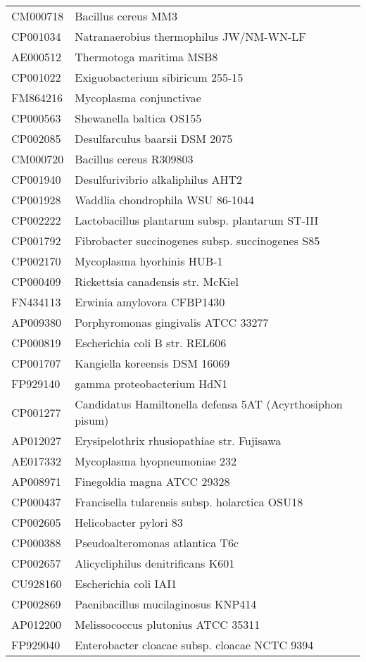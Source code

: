 \begin{longtable}{ll}
CM000718 & Bacillus cereus MM3\\
CP001034 & Natranaerobius thermophilus JW/NM-WN-LF\\
AE000512 & Thermotoga maritima MSB8\\
CP001022 & Exiguobacterium sibiricum 255-15\\
FM864216 & Mycoplasma conjunctivae\\
CP000563 & Shewanella baltica OS155\\
CP002085 & Desulfarculus baarsii DSM 2075\\
CM000720 & Bacillus cereus R309803\\
CP001940 & Desulfurivibrio alkaliphilus AHT2\\
CP001928 & Waddlia chondrophila WSU 86-1044\\
CP002222 & Lactobacillus plantarum subsp. plantarum ST-III\\
CP001792 & Fibrobacter succinogenes subsp. succinogenes S85\\
CP002170 & Mycoplasma hyorhinis HUB-1\\
CP000409 & Rickettsia canadensis str. McKiel\\
FN434113 & Erwinia amylovora CFBP1430\\
AP009380 & Porphyromonas gingivalis ATCC 33277\\
CP000819 & Escherichia coli B str. REL606\\
CP001707 & Kangiella koreensis DSM 16069\\
FP929140 & gamma proteobacterium HdN1\\
CP001277 & Candidatus Hamiltonella defensa 5AT (Acyrthosiphon pisum)\\
AP012027 & Erysipelothrix rhusiopathiae str. Fujisawa\\
AE017332 & Mycoplasma hyopneumoniae 232\\
AP008971 & Finegoldia magna ATCC 29328\\
CP000437 & Francisella tularensis subsp. holarctica OSU18\\
CP002605 & Helicobacter pylori 83\\
CP000388 & Pseudoalteromonas atlantica T6c\\
CP002657 & Alicycliphilus denitrificans K601\\
CU928160 & Escherichia coli IAI1\\
CP002869 & Paenibacillus mucilaginosus KNP414\\
AP012200 & Melissococcus plutonius ATCC 35311\\
FP929040 & Enterobacter cloacae subsp. cloacae NCTC 9394\\

\end{longtable}
